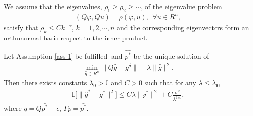 \documentclass[10pt,a4paper]{amsart}
\begin{document}
\begin{assumption}\label{ass-1} We assume that the eigenvalues, $\rho_1\geq\rho_2\geq\cdots$, of the eigenvalue problem
\begin{align*}
(Q\varphi,Qu)=\rho(\varphi,u),~~\forall u\in R^n,    
\end{align*}
satisfy that $\rho_k\leq Ck^{-\alpha}$, $k=1,2,\cdots,n$ and the corresponding eigenvectors form an orthonormal basis respect to the inner product.
\end{assumption}

\begin{theorem}\label{Th-sto-1}
Let Assumption \ref{ass-1} be fulfilled, and $\hat{p^*}$ be the unique solution of 
\begin{align}\label{Q-mini-1}
\min\limits_{\hat{g}\in R^n} \|Q\hat{g}-g^\delta\| + \lambda\|\hat{g}\|^2.
\end{align}
Then there exists constants $\lambda_0>0$ and $C>0$ such that for any $\lambda\leq\lambda_0$,
\begin{align*}
\mathbb{E}\big[\|\hat{g}^*-g^*\|^2\big]\leq C\lambda\|g^*\|^2+C\frac{\sigma^2}{\lambda^{1/\alpha}},
\end{align*}
where $q=Q\bar{p^*}+\epsilon$, $\Gamma\bar{p}=\bar{p^*}$.
\end{theorem}
\end{document}

